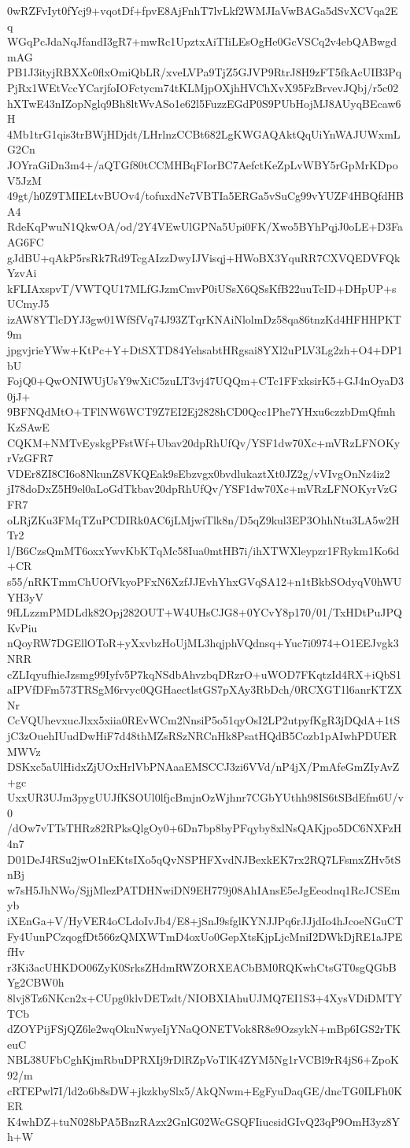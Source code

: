 0wRZFvIyt0fYcj9+vqotDf+fpvE8AjFnhT7lvLkf2WMJIaVwBAGa5dSvXCVqa2Eq
WGqPcJdaNqJfandI3gR7+mwRc1UpztxAiTIiLEsOgHe0GcVSCq2v4ebQABwgdmAG
PB1J3ityjRBXXc0flxOmiQbLR/xveLVPa9TjZ5GJVP9RtrJ8H9zFT5fkAcUIB3Pq
PjRx1WEtVccYCarjfoIOFctycm74tKLMjpOXjhHVChXvX95FzBrvevJQbj/r5c02
hXTwE43nIZopNglq9Bh8ltWvASo1e62l5FuzzEGdP0S9PUbHojMJ8AUyqBEcaw6H
4Mb1trG1qis3trBWjHDjdt/LHrlnzCCBt682LgKWGAQAktQqUiYnWAJUWxmLG2Cn
JOYraGiDn3m4+/aQTGf80tCCMHBqFIorBC7AefctKeZpLvWBY5rGpMrKDpoV5JzM
49gt/h0Z9TMIELtvBUOv4/tofuxdNc7VBTIa5ERGa5vSuCg99vYUZF4HBQfdHBA4
RdeKqPwuN1QkwOA/od/2Y4VEwUlGPNa5Upi0FK/Xwo5BYhPqjJ0oLE+D3FaAG6FC
gJdBU+qAkP5rsRk7Rd9TcgAIzzDwyIJVisqj+HWoBX3YquRR7CXVQEDVFQkYzvAi
kFLIAxspvT/VWTQU17MLfGJzmCmvP0iUSsX6QSsKfB22uuTcID+DHpUP+sUCmyJ5
izAW8YTlcDYJ3gw01WfSfVq74J93ZTqrKNAiNlolmDz58qa86tnzKd4HFHHPKT9m
jpgvjrieYWw+KtPc+Y+DtSXTD84YehsabtHRgsai8YXl2uPLV3Lg2zh+O4+DP1bU
FojQ0+QwONIWUjUsY9wXiC5zuLT3vj47UQQm+CTc1FFxksirK5+GJ4nOyaD30jJ+
9BFNQdMtO+TFlNW6WCT9Z7EI2Ej2828hCD0Qcc1Phe7YHxu6czzbDmQfmhKzSAwE
CQKM+NMTvEyskgPFstWf+Ubav20dpRhUfQv/YSF1dw70Xc+mVRzLFNOKyrVzGFR7
VDEr8ZI8CI6o8NkunZ8VKQEak9sEbzvgx0bvdlukaztXt0JZ2g/vVIvgOnNz4iz2
jI78doDxZ5H9el0aLoGdTkbav20dpRhUfQv/YSF1dw70Xc+mVRzLFNOKyrVzGFR7
oLRjZKu3FMqTZuPCDIRk0AC6jLMjwiTlk8n/D5qZ9kul3EP3OhhNtu3LA5w2HTr2
l/B6CzsQmMT6oxxYwvKbKTqMc58Iua0mtHB7i/ihXTWXleypzr1FRykm1Ko6d+CR
s55/nRKTmmChUOfVkyoPFxN6XzfJJEvhYhxGVqSA12+n1tBkbSOdyqV0hWUYH3yV
9fLLzzmPMDLdk82Opj282OUT+W4UHsCJG8+0YCvY8p170/01/TxHDtPuJPQKvPiu
nQoyRW7DGEllOToR+yXxvbzHoUjML3hqjphVQdnsq+Yuc7i0974+O1EEJvgk3NRR
cZLIqyufhieJzsmg99Iyfv5P7kqNSdbAhvzbqDRzrO+uWOD7FKqtzId4RX+iQbS1
aIPVfDFm573TRSgM6rvyc0QGHaectlstGS7pXAy3RbDch/0RCXGT1l6anrKTZXNr
CcVQUhevxucJlxx5xiia0REvWCm2NnsiP5o51qyOsI2LP2utpyfKgR3jDQdA+1tS
jC3zOuehIUudDwHiF7d48thMZsRSzNRCnHk8PsatHQdB5Cozb1pAIwhPDUERMWVz
DSKxc5aUlHidxZjUOxHrlVbPNAaaEMSCCJ3zi6VVd/nP4jX/PmAfeGmZIyAvZ+gc
UxxUR3UJm3pygUUJfKSOUl0lfjcBmjnOzWjhnr7CGbYUthh98IS6tSBdEfm6U/v0
/dOw7vTTsTHRz82RPksQlgOy0+6Dn7bp8byPFqyby8xlNsQAKjpo5DC6NXFzH4n7
D01DeJ4RSu2jwO1nEKtsIXo5qQvNSPHFXvdNJBexkEK7rx2RQ7LFsmxZHv5tSnBj
w7sH5JhNWo/SjjMlezPATDHNwiDN9EH779j08AhIAnsE5eJgEeodnq1RcJCSEmyb
iXEnGa+V/HyVER4oCLdoIvJb4/E8+jSnJ9sfglKYNJJPq6rJJjdIo4hJcoeNGuCT
Fy4UunPCzqogfDt566zQMXWTmD4oxUo0GepXtsKjpLjcMniI2DWkDjRE1aJPEfHv
r3Ki3acUHKDO06ZyK0SrksZHdmRWZORXEACbBM0RQKwhCtsGT0sgQGbBYg2CBW0h
8lvj8Tz6NKcn2x+CUpg0klvDETzdt/NIOBXIAhuUJMQ7EI1S3+4XysVDiDMTYTCb
dZOYPijFSjQZ6le2wqOkuNwyeIjYNaQONETVok8R8e9OzsykN+mBp6IGS2rTKeuC
NBL38UFbCghKjmRbuDPRXIj9rDlRZpVoTlK4ZYM5Ng1rVCBl9rR4jS6+ZpoK92/m
cRTEPwl7I/ld2o6b8sDW+jkzkbySlx5/AkQNwm+EgFyuDaqGE/dncTG0ILFh0KER
K4whDZ+tuN028bPA5BnzRAzx2GnlG02WcGSQFIiucsidGIvQ23qP9OmH3yz8Yh+W
